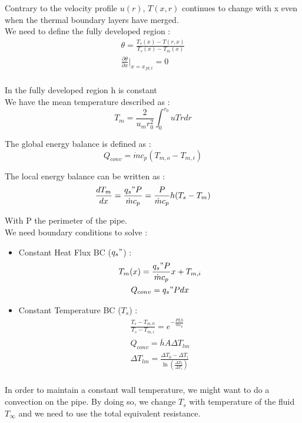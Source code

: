 \documentclass[../main.tex]{subfiles}
\begin{document}
Contrary to the velocity profile $u(r)$, $T(x,r)$ continues to change with x even when the thermal boundary layers have merged.\\

We need to define the fully developed region : \begin{equation}
    \begin{gathered}
        \theta = \frac{T_s(x) - T(r,x)}{T_s(x) - T_m(x)}\\
        \frac{\partial \theta}{\partial x}\lvert_{x = x_{fd,t}} = 0\\
    \end{gathered}
\end{equation}

\warning In the fully developed region h is constant\\

We have the mean temperature described as : \begin{equation}
    T_m = \frac{2}{u_m r_0^2} \int_0^{r_0} u Trdr
\end{equation}

The global energy balance is defined as : \begin{equation}
    Q_{conv} = \dot{m} c_p(T_{m,o}-T_{m,i})
\end{equation}

The local energy balance can be written as : \begin{equation}
    \frac{dT_m}{dx} = \frac{q_s"P}{\dot{m}c_p} = \frac{P}{\dot{m}c_p} h(T_s-T_m)
\end{equation}

With P the perimeter of the pipe.\\

We need boundary conditions to solve : \begin{itemize}
    \item Constant Heat Flux BC ($q_s"$) : \begin{equation}
    \begin{gathered}
        T_m(x) = \frac{q_s" P}{\dot{m}c_p}x + T_{m,i}\\
        Q_{conv} = q_s" Pdx\\
        \end{gathered}
    \end{equation}
    \item Constant Temperature BC ($T_s$) : \begin{equation}\begin{gathered}
        \frac{T_s-T_{m,0}}{T_s-T_{m,i}} = e^{-\frac{PL \overline{h}}{\dot{m}c_p}}\\
        Q_{conv} = \overline{h} A \Delta T_{lm}\\
        \Delta T_{lm} = \frac{\Delta T_0-\Delta T_i}{\ln(\frac{\Delta T_0}{\Delta T_i})}\\
        \end{gathered}
    \end{equation}
\end{itemize}
In order to maintain a constant wall temperature, we might want to do a convection on the pipe. By doing so, we change $T_s$ with temperature of the fluid $T_\infty$ and we need to use the total equivalent resistance.\\
\end{document}

